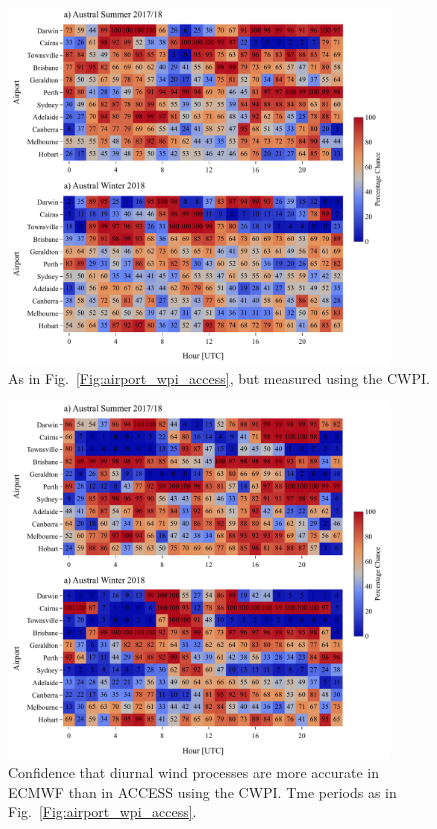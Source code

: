 \documentclass[10pt]{article}
\begin{document}
\begin{figure}
\centering
\includegraphics[keepaspectratio=true,width=0.90\textwidth]{airport_cwpi_access.pdf}
\caption{As in Fig.~\ref{Fig:airport_wpi_access}, but measured using the CWPI.}
\label{Fig:airport_cwpi_access}
\end{figure}

\begin{figure}
\centering
\includegraphics[keepaspectratio=true,width=0.90\textwidth]{airport_cwpi_ec_vs_access.pdf}
\caption{Confidence that diurnal wind processes are more accurate in ECMWF than in ACCESS using the CWPI. Tme periods as in Fig.~\ref{Fig:airport_wpi_access}.}
\label{Fig:airport_cwpi_access}
\end{figure}
\end{document}
